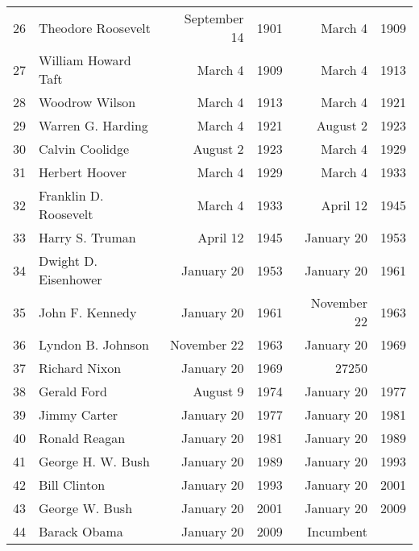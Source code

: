 \begin{longtable}{c|l r@{,}l @{$\rightarrow$} r@{,}l}
26 & Theodore Roosevelt & September 14& 1901 & March 4& 1909\\
27 & William Howard Taft & March 4& 1909 & March 4& 1913\\
28 & Woodrow Wilson & March 4& 1913 & March 4& 1921\\
29 & Warren G. Harding & March 4& 1921 & August 2& 1923\\
30 & Calvin Coolidge & August 2& 1923 & March 4& 1929\\
31 & Herbert Hoover & March 4& 1929 & March 4& 1933\\
32 & Franklin D. Roosevelt & March 4& 1933 & April 12& 1945\\
33 & Harry S. Truman & April 12& 1945 & January 20& 1953\\
34 & Dwight D. Eisenhower & January 20& 1953 & January 20& 1961\\
35 & John F. Kennedy & January 20& 1961 & November 22& 1963\\
36 & Lyndon B. Johnson & November 22& 1963 & January 20& 1969\\
37 & Richard Nixon & January 20& 1969 & 27250\\
38 & Gerald Ford & August 9& 1974 & January 20& 1977\\
39 & Jimmy Carter & January 20& 1977 & January 20& 1981\\
40 & Ronald Reagan & January 20& 1981 & January 20& 1989\\
41 & George H. W. Bush & January 20& 1989 & January 20& 1993\\
42 & Bill Clinton & January 20& 1993 & January 20& 2001\\
43 & George W. Bush & January 20& 2001 & January 20& 2009\\
44 & Barack Obama & January 20& 2009 & Incumbent
\end{longtable}
